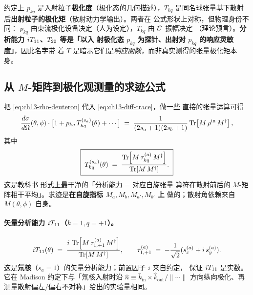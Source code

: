 \begin{remark}
\label{rem:ch13-pkq-vs-Tkq}
约定上 \(p_{kq}\) 是入射粒子\textbf{极化度}（极化态的几何描述），\(T_{kq}\)
是同名球张量基下散射后\textbf{出射粒子的极化矩}（散射动力学输出）。两者在
公式形状上对称，但物理身份不同：
\(p_{kq}\) 由束流极化设备决定（人为设定），\(T_{kq}\) 由 \(\hat{U}\)-振幅决定
（理论预言）。\textbf{分析能力 \({i T_{11}}\)、\({T_{20}}\) 等是「以入
射极化态 \(p_{kq}\) 为探针、出射对 \(p_{kq}\) 的响应灵敏度」}，因此名字带
着 \(T\) 是暗示它们是\emph{响应函数}，而非真实测得的张量极化矩本身。
\end{remark}

\subsection{从 \(M\)-矩阵到极化观测量的求迹公式}
\label{subsec:ch13-M-to-Tkq}

把 \eqref{eq:ch13-rho-deuteron} 代入 \eqref{eq:ch13-diff-trace}，做一些
直接的张量运算可得
\begin{equation}
\label{eq:ch13-master-trace}
\frac{d\sigma}{d\Omega}(\theta,\phi) \cdot \big[1 + p_{kq}\, T_{kq}^{(s_a)}(\theta) + \cdots\big]
\;=\;
\frac{1}{(2 s_a + 1)(2 s_b + 1)}
\Tr\!\left[ M\, \rho^{\text{in}}\, M^\dagger\right],
\end{equation}
其中
\begin{equation}
\label{eq:ch13-Tkq-master}
\boxed{\;
T_{kq}^{(s_a)}(\theta)
\;=\;
\frac{\Tr\!\left[ M\, \tau_{kq}^{(a)}\,M^\dagger\right]}
     {\Tr\!\left[ M\, M^\dagger\right]}.
\;}
\end{equation}
这是教科书 \cite{OhlsenReports} 形式上最干净的「分析能力 = 对应自旋张量
算符在散射前后的 \(M\)-矩阵相干平均」。求迹是\textbf{在自旋指标 \(M_a, M_b,
M_{a'}, M_{b'}\) 上} 做的；散射角依赖来自 \(M(\theta,\phi)\) 自身。

\paragraph{矢量分析能力 \({i T_{11}}\)（\(k = 1, q = +1\)）。}
\begin{equation}
\label{eq:ch13-iT11-formula}
{i T_{11}}(\theta)
\;=\;
\frac{i\,\Tr\!\left[ M\, \tau_{1,+1}^{(a)}\,M^\dagger\right]}
     {\Tr\!\left[ M\, M^\dagger\right]},
\qquad
\tau_{1,+1}^{(a)} \;=\; -\frac{1}{\sqrt{2}}(s_x^{(a)} + i\, s_y^{(a)}).
\end{equation}
这是\textbf{氘核}（\(s_a = 1\)）的矢量分析能力；前置因子 \(i\) 来自约定，
保证 \({i T_{11}}\) 是实数。它在 Madison 约定下与「氘核入射时沿
\(\hat{n}\equiv \hat{k}_{\text{in}}\times\hat{k}_{\text{out}}/\|\cdots\|\)
方向纵向极化、再测量散射偏左/偏右不对称」给出的实验量相同。

